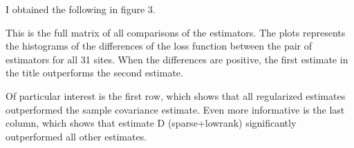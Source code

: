 I obtained the following in figure 3.

This is the full matrix of all comparisons of the estimators.  The plots represents the histograms of the differences of the loss function between the pair of estimators for all 31 sites.  When the differences are positive, the first estimate in the title outperforms the second estimate.

Of particular interest is the first row, which shows that all regularized estimates  outperformed the sample covariance estimate.  Even more informative is the last column, which shows that estimate D (sparse+lowrank) significantly outperformed all other estimates.



